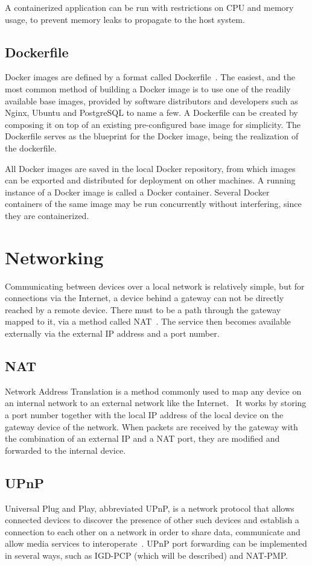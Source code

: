A containerized application can be run with restrictions on CPU and memory usage, to prevent memory leaks to propagate to the host system.

\subsection{Dockerfile}
Docker images are defined by a format called Dockerfile~\cite{docker-dockerfile}. The easiest, and the most common method of building a Docker image is to use one of the readily available base images, provided by software distributors and developers such as Nginx, Ubuntu and PostgreSQL to name a few. A Dockerfile can be created by composing it on top of an existing pre-configured base image for simplicity. The Dockerfile serves as the blueprint for the Docker image, being the realization of the dockerfile.

All Docker images are saved in the local Docker repository, from which images can be exported and distributed for deployment on other machines. A running instance of a Docker image is called a Docker container. Several Docker containers of the same image may be run concurrently without interfering, since they are containerized.

\section{Networking}
Communicating between devices over a local network is relatively simple, but for connections via the Internet, a device behind a gateway can not be directly reached by a remote device. There must to be a path through the gateway mapped to it, via a method called NAT~\cite{kurose:p349}. The service then becomes available externally via the external IP address and a port number. 

\subsection{NAT}
Network Address Translation is a method commonly used to map any device on an internal network to an external network like the Internet.~\cite{kurose:p349} It works by storing a port number together with the local IP address of the local device on the gateway device of the network. When packets are received by the gateway with the combination of an external IP and a NAT port, they are modified and forwarded to the internal device.

\subsection{UPnP}
Universal Plug and Play, abbreviated UPnP, is a network protocol that allows connected devices to discover the presence of other such devices and establish a connection to each other on a network in order to share data, communicate and allow media services to interoperate~\cite{kurose:p352}. UPnP port forwarding can be implemented in several ways, such as IGD-PCP (which will be described) and NAT-PMP.

